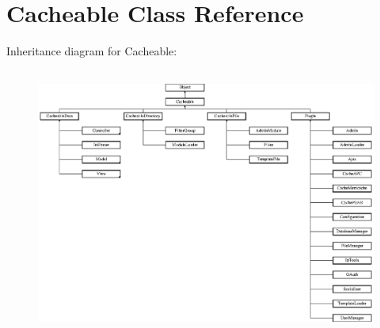 \hypertarget{class_cacheable}{\section{Cacheable Class Reference}
\label{class_cacheable}
}
Inheritance diagram for Cacheable\-:\begin{figure}[H]
\begin{center}
\leavevmode
\includegraphics[height=8.880597cm]{class_cacheable}
\end{center}
\end{figure}
